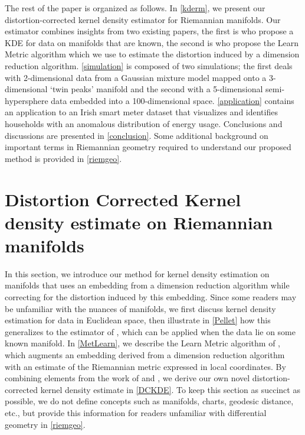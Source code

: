 \documentclass[11pt,a4paper,]{article}
\begin{document}
The rest of the paper is organized as follows. In \autoref{kderm}, we present our distortion-corrected kernel density estimator for Riemannian manifolds. Our estimator combines insights from two existing papers, the first is \textcite{Pelletier2005-vu} who propose a KDE for data on manifolds that are known, the second is \textcite{Perrault-Joncas2013-pq} who propose the Learn Metric algorithm which we use to estimate the distortion induced by a dimension reduction algorithm. \autoref{simulation} is composed of two simulations; the first deals with 2-dimensional data from a Gaussian mixture model mapped onto a 3-dimensional `twin peaks' manifold and the second with a 5-dimensional semi-hypersphere data embedded into a 100-dimensional space. \autoref{application} contains an application to an Irish smart meter dataset that visualizes and identifies households with an anomalous distribution of energy usage. Conclusions and discussions are presented in \autoref{conclusion}. Some additional background on important terms in Riemannian geometry required to understand our proposed method is provided in \autoref{riemgeo}.

\hypertarget{kderm}{%
\section{Distortion Corrected Kernel density estimate on Riemannian manifolds}\label{kderm}}

In this section, we introduce our method for kernel density estimation on manifolds that uses an embedding from a dimension reduction algorithm while correcting for the distortion induced by this embedding. Since some readers may be unfamiliar with the nuances of manifolds, we first discuss kernel density estimation for data in Euclidean space, then illustrate in \autoref{Pellet} how this generalizes to the estimator of \textcite{Pelletier2005-vu}, which can be applied when the data lie on some known manifold. In \autoref{MetLearn}, we describe the Learn Metric algorithm of \textcite{Perrault-Joncas2013-pq}, which augments an embedding derived from a dimension reduction algorithm with an estimate of the Riemannian metric expressed in local coordinates. By combining elements from the work of \textcite{Pelletier2005-vu} and \textcite{Perrault-Joncas2013-pq}, we derive our own novel distortion-corrected kernel density estimate in \autoref{DCKDE}. To keep this section as succinct as possible, we do not define concepts such as manifolds, charts, geodesic distance, etc., but provide this information for readers unfamiliar with differential geometry in \autoref{riemgeo}.
\end{document}
